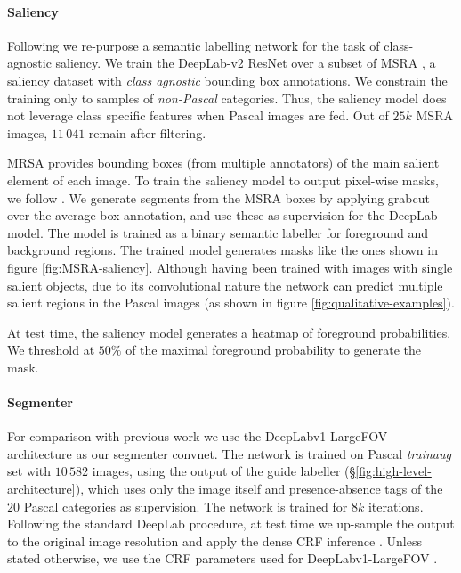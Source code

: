 \documentclass[british,10pt,twocolumn,letterpaper]{article}
\begin{document}
\paragraph{\label{sec:Saliency-details}Saliency}

Following \cite{Zhao2015Cvpr,Li2016Tip,Li2016Cvpr} we re-purpose
a semantic labelling network for the task of class-agnostic saliency.
 We train the DeepLab-v2 ResNet \cite{Chen2016ArxivDeeplabv2} over
  a subset of MSRA \cite{liu2011learning}, a saliency dataset with
  \emph{class agnostic} bounding box annotations. We constrain the training
  only to samples of \emph{non-Pascal} categories. Thus, the saliency
  model does not leverage class specific features when Pascal images
  are fed. Out of $25k$ MSRA images, $11\,041$ remain after filtering. 
  
MRSA provides bounding boxes (from multiple annotators) of the main
salient element of each image. To train the saliency model to output
pixel-wise masks, we follow \cite{Khoreva2016Arxiv}. We generate
segments from the MSRA boxes by applying grabcut over the average
box annotation, and use these as supervision for the DeepLab model.
The model is trained as a binary semantic labeller for foreground
and background regions. The trained model generates masks like the
ones shown in figure \ref{fig:MSRA-saliency}. Although having been
trained with images with single salient objects, due to its convolutional
nature the network can predict multiple salient regions in the Pascal
images (as shown in figure \ref{fig:qualitative-examples}).

At test time, the saliency model generates a heatmap of foreground
probabilities. We threshold at $50\%$ of the maximal foreground
probability to generate the mask.


\paragraph{Segmenter}

For comparison with previous work we use the DeepLabv1-LargeFOV \cite{Chen2016ArxivDeeplabv2}
architecture as our segmenter convnet. The network is trained on Pascal
\textit{trainaug} set with $10\,582$ images, using the output of the guide
labeller (\S\ref{fig:high-level-architecture}), which uses only
the image itself and presence-absence tags of the $20$ Pascal categories
as supervision. The network is trained for $8k$ iterations. \\
Following the standard DeepLab procedure, at test time we up-sample
the output to the original image resolution and apply the dense CRF
inference \cite{Kraehenbuehl2011Nips}. Unless stated otherwise, we
use the CRF parameters used for DeepLabv1-LargeFOV \cite{Chen2016ArxivDeeplabv2}.
\end{document}
